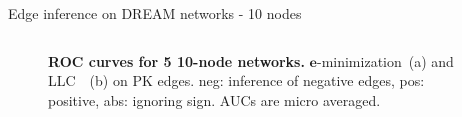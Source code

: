 \begin{frame}{Edge inference on DREAM networks - 10 nodes}
\begin{columns}
\begin{column}{0.6\textwidth}
\begin{figure}[ht]
\begin{subfigure}[b]{0.49\textwidth}
\end{subfigure}
\caption{\textbf{ROC curves for 5 10-node networks.} $\boldsymbol{e}$-minimization~(a) and LLC~\cite{EberhardtLLC}~(b) on PK edges. neg: inference of negative edges, pos: positive, abs: ignoring sign. AUCs are micro averaged.}
\label{fig:roc_pk_10}
\end{figure}

\end{column}
\end{columns}
\end{frame}

